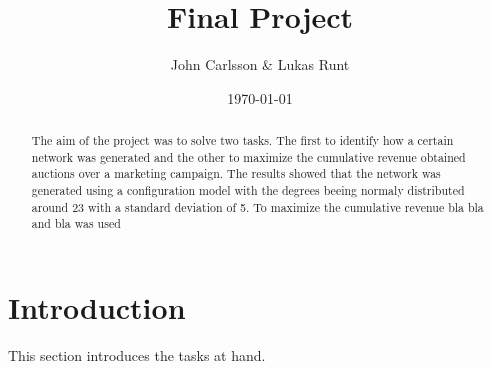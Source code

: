 \documentclass[conference]{IEEEtran}
\begin{document}
\title{Final Project}
\author{John Carlsson & Lukas Runt}
\date{\today}



\maketitle

\begin{abstract}
The aim of the project was to solve two tasks. The first to identify how a certain network was generated
and the other to maximize the cumulative revenue obtained auctions over a marketing campaign. The results showed
that the network was generated using a configuration model with the degrees beeing normaly distributed around
23 with a standard deviation of 5. To maximize the cumulative revenue bla bla and bla was used
\end{abstract}

\section{Introduction}
This section introduces the tasks at hand.
\end{document}
